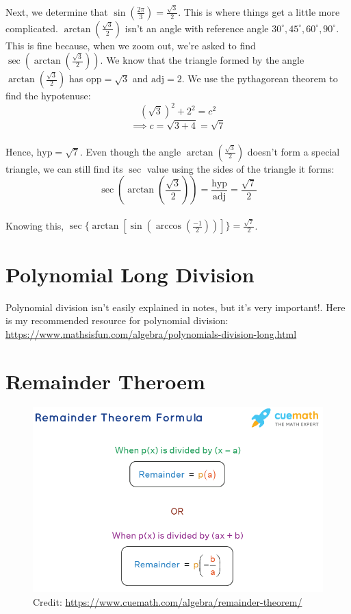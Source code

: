 \documentclass[12pt]{article}
\begin{document}
Next, we determine that \(\sin(\frac{2\pi}{3})=\frac{\sqrt{3}}{2}\). This is where things get a little more complicated. \(\arctan(\frac{\sqrt{3}}{2})\) isn't an angle with reference angle \(30^{\circ}, 45^{\circ}, 60^{\circ}, 90^{\circ}\). This is fine because, when we zoom out, we're asked to find \(\sec(\arctan(\frac{\sqrt{3}}{2}))\). We know that the triangle formed by the angle \(\arctan(\frac{\sqrt{3}}{2})\) has \(\text{opp}=\sqrt{3}\) and \(\text{adj}=2\). We use the pythagorean theorem to find the hypotenuse:\\

\[(\sqrt{3})^2+2^2=c^2\]
\[\implies c=\sqrt{3+4}=\sqrt{7}\]\\

Hence, \(\text{hyp}=\sqrt{7}\). Even though the angle \(\arctan(\frac{\sqrt{3}}{2})\) doesn't form a special triangle, we can still find its \(\sec\) value using the sides of the triangle it forms:\\

\[\sec\left(\arctan\left(\frac{\sqrt{3}}{2}\right)\right)=\frac{\text{hyp}}{\text{adj}}=\frac{\sqrt{7}}{2}\]\\

Knowing this, \(\sec\{\arctan[\sin(\arccos(\frac{-1}{2}))]\}=\frac{\sqrt{7}}{2}\).

\section{Polynomial Long Division}

Polynomial division isn't easily explained in notes, but it's very important!. Here is my recommended resource for polynomial division:\\

\url{https://www.mathsisfun.com/algebra/polynomials-division-long.html}

\section{Remainder Theroem}

\begin{figure}[H]
	\centering
	\includegraphics[scale=0.6]{rt.png}
	\caption{Credit: \url{https://www.cuemath.com/algebra/remainder-theorem/}}
\end{figure}
\end{document}

